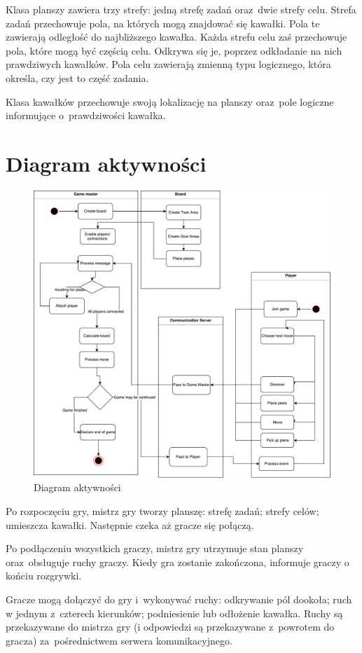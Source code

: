 \documentclass[a4paper]{article}
\begin{document}
Klasa planszy zawiera trzy strefy: jedną strefę zadań oraz~dwie strefy celu.
Strefa zadań przechowuje pola, na których mogą znajdować się kawałki.
Pola te zawierają odległość do najbliższego kawałka.
Każda strefu celu zaś przechowuje pola, które mogą być częścią celu.
Odkrywa się je, poprzez odkładanie na nich prawdziwych kawałków.
Pola celu zawierają zmienną typu logicznego, która określa, czy jest to część zadania.

Klasa kawałków przechowuje swoją lokalizację na planszy oraz~pole logiczne informujące o~prawdziwości kawałka.

\section{Diagram aktywności}
\begin{figure}[H]
\caption{Diagram aktywności}
\centering
\includegraphics[scale=0.5]{diagram_aktywnosci.pdf}
\end{figure}
Po rozpoczęciu gry, mistrz gry tworzy planszę: strefę zadań; strefy celów; umieszcza kawałki.
Następnie czeka aż gracze się połączą.

Po podłączeniu wszystkich graczy, mistrz gry utrzymuje stan planszy oraz~obsługuje ruchy graczy.
Kiedy gra zostanie zakończona, informuje graczy o końciu rozgrywki.

Gracze mogą dołączyć do gry i~wykonywać ruchy: odkrywanie pól dookoła; ruch w jednym z~czterech kierunków; podniesienie lub odłożenie kawałka.
Ruchy są przekazywane do mistrza gry (i odpowiedzi są przekazywane z~powrotem do gracza) za~pośrednictwem serwera komunikacyjnego.
\end{document}
